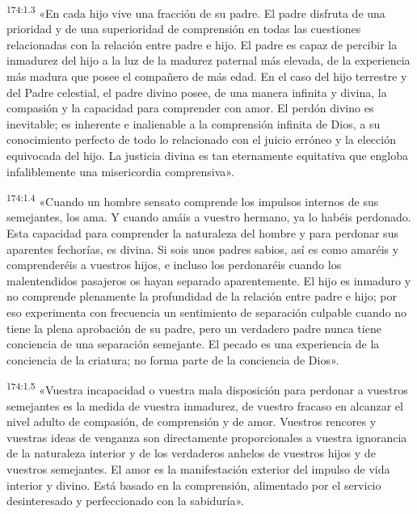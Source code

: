 \par 
\textsuperscript{174:1.3} «En cada hijo vive una fracción de su padre. El padre disfruta de una prioridad y de una superioridad de comprensión en todas las cuestiones relacionadas con la relación entre padre e hijo. El padre es capaz de percibir la inmadurez del hijo a la luz de la madurez paternal más elevada, de la experiencia más madura que posee el compañero de más edad. En el caso del hijo terrestre y del Padre celestial, el padre divino posee, de una manera infinita y divina, la compasión y la capacidad para comprender con amor. El perdón divino es inevitable; es inherente e inalienable a la comprensión infinita de Dios, a su conocimiento perfecto de todo lo relacionado con el juicio erróneo y la elección equivocada del hijo. La justicia divina es tan eternamente equitativa que engloba infaliblemente una misericordia comprensiva».

\par 
\textsuperscript{174:1.4} «Cuando un hombre sensato comprende los impulsos internos de sus semejantes, los ama. Y cuando amáis a vuestro hermano, ya lo habéis perdonado. Esta capacidad para comprender la naturaleza del hombre y para perdonar sus aparentes fechorías, es divina. Si sois unos padres sabios, así es como amaréis y comprenderéis a vuestros hijos, e incluso los perdonaréis cuando los malentendidos pasajeros os hayan separado aparentemente. El hijo es inmaduro y no comprende plenamente la profundidad de la relación entre padre e hijo; por eso experimenta con frecuencia un sentimiento de separación culpable cuando no tiene la plena aprobación de su padre, pero un verdadero padre nunca tiene conciencia de una separación semejante. El pecado es una experiencia de la conciencia de la criatura; no forma parte de la conciencia de Dios».

\par 
\textsuperscript{174:1.5} «Vuestra incapacidad o vuestra mala disposición para perdonar a vuestros semejantes es la medida de vuestra inmadurez, de vuestro fracaso en alcanzar el nivel adulto de compasión, de comprensión y de amor. Vuestros rencores y vuestras ideas de venganza son directamente proporcionales a vuestra ignorancia de la naturaleza interior y de los verdaderos anhelos de vuestros hijos y de vuestros semejantes. El amor es la manifestación exterior del impulso de vida interior y divino. Está basado en la comprensión, alimentado por el servicio desinteresado y perfeccionado con la sabiduría».


